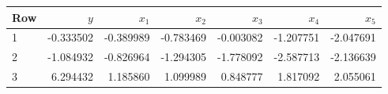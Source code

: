 \begin{center}
\small
\setlength{\tabcolsep}{4pt}
\begin{tabular}{lrrrrrr}
\toprule
Row & $y$ & $x_1$ & $x_2$ & $x_3$ & $x_4$ & $x_5$ \\
\midrule
1 & -0.333502 & -0.389989 & -0.783469 & -0.003082 & -1.207751 & -2.047691 \\
2 & -1.084932 & -0.826964 & -1.294305 & -1.778092 & -2.587713 & -2.136639 \\
3 & 6.294432 & 1.185860 & 1.099989 & 0.848777 & 1.817092 & 2.055061 \\
\bottomrule
\end{tabular}
\end{center}
